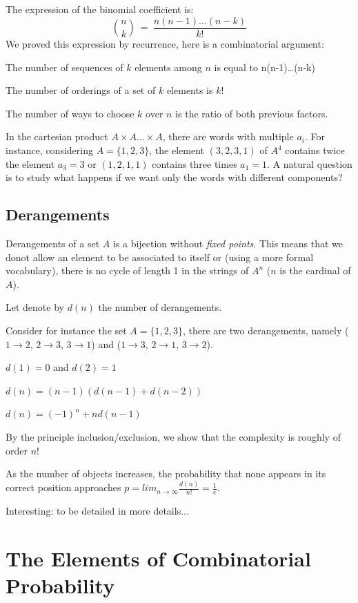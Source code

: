 The expression of the binomial coefficient is:
\[ {n \choose k} \ = \ \frac{n(n-1)\ldots(n-k)}{k!} \]
We proved this expression by recurrence, here is a combinatorial argument:

The number of sequences of $k$ elements among $n$ is equal to n(n-1)\ldots(n-k)

The number of orderings of a set of $k$ elements is $k!$

The number of ways to choose $k$ over $n$ is the ratio of both previous factors.

\medskip

In the cartesian product  $A \times A ... \times A$, there are words with multiple $a_i$.
For instance, considering $A=\{ 1,2,3 \}$, the element $(3,2,3,1)$ of $A^4$ contains twice the element $a_3=3$ 
or $(1,2,1,1)$ contains three times $a_1=1$. 
A natural question is to study what happens if we want only the words with different components?


\subsection{Derangements}

Derangements of a set $A$ is a bijection without \textit{fixed points}.
This means that we donot allow an element to be associated to itself
or (using a more formal vocabulary), there is no cycle of length 1 in the strings of $A^n$
($n$ is the cardinal of $A$).

Let denote by $d(n)$ the number of derangements.
\medskip

Consider for instance the set $A = \{1,2,3 \}$, there are two derangements, namely
($1 \rightarrow 2$, $2 \rightarrow 3$, $3 \rightarrow 1$)
and 
($1 \rightarrow 3$, $2 \rightarrow 1$, $3 \rightarrow 2$).
\medskip

$d(1) = 0$ and $d(2) = 1$

$d(n) = (n-1) (d(n-1) + d(n-2))$

$d(n) = (-1)^n + n d(n-1)$
\bigskip

By the principle inclusion/exclusion, we show that the complexity is roughly of order $n!$

As the number of objects increases, the probability that none appears in its correct position approaches
$p=lim_{n \rightarrow \infty}\frac{d(n)}{n!}=\frac{1}{e}$. 

{\Denis Interesting: to be detailed in more details...}


\section{The Elements of Combinatorial Probability}

